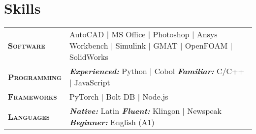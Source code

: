 \documentclass[a4paper,10pt]{article}
\makeatletter
\newcommand{\fillcell}{@{\extracolsep{\fill}}}		%
\makeatother
\begin{document}
\section{\textsf{Skills}}
\begin{tabular*}{\linewidth}{\fillcell l l \fillcell}
	\textbf{\scshape \textsf{Software}} &
	AutoCAD $|$ MS Office $|$ Photoshop $|$ Ansys Workbench $|$ Simulink $|$ GMAT $|$ OpenFOAM $|$ SolidWorks \\

	\textbf{\scshape \textsf{Programming}} &
	\emph{\textbf{Experienced:}} Python $|$ Cobol \quad
	\emph{\textbf{Familiar:}} C/C++ $|$ JavaScript \\

	\textbf{\scshape \textsf{Frameworks}} &
	PyTorch $|$ Bolt DB $|$ Node.js \\

	\textbf{\scshape \textsf{Languages}} &
	\emph{\textbf{Native:}} Latin \quad
	\emph{\textbf{Fluent:}} Klingon $|$ Newspeak \quad
	\emph{\textbf{Beginner:}} English (A1)
\end{tabular*}
\end{document}

